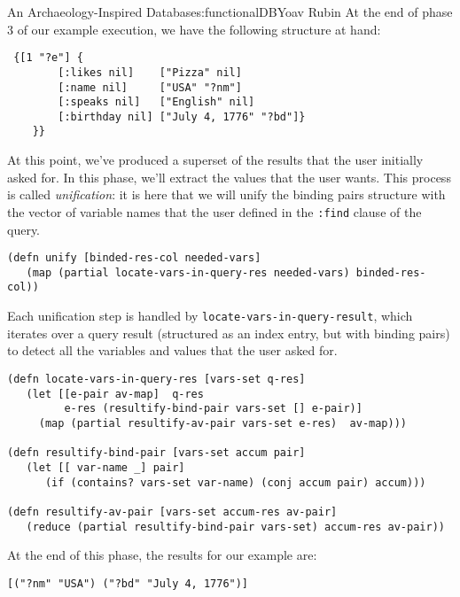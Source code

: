 \begin{aosachapter}{An Archaeology-Inspired Database}{s:functionalDB}{Yoav Rubin}
At the end of phase 3 of our example execution, we have the following
structure at hand:

\begin{verbatim}
 {[1 "?e"] {
        [:likes nil]    ["Pizza" nil]
        [:name nil]     ["USA" "?nm"]
        [:speaks nil]   ["English" nil] 
        [:birthday nil] ["July 4, 1776" "?bd"]} 
    }}
\end{verbatim}

\label{phase-4-unify-and-report}

At this point, we've produced a superset of the results that the user
initially asked for. In this phase, we'll extract the values that the
user wants. This process is called \emph{unification}: it is here that
we will unify the binding pairs structure with the vector of variable
names that the user defined in the \texttt{:find} clause of the query.

\begin{verbatim}
(defn unify [binded-res-col needed-vars]
   (map (partial locate-vars-in-query-res needed-vars) binded-res-col))
\end{verbatim}

Each unification step is handled by
\texttt{locate-vars-in-query-result}, which iterates over a query result
(structured as an index entry, but with binding pairs) to detect all the
variables and values that the user asked for.

\begin{verbatim}
(defn locate-vars-in-query-res [vars-set q-res]
   (let [[e-pair av-map]  q-res
         e-res (resultify-bind-pair vars-set [] e-pair)]
     (map (partial resultify-av-pair vars-set e-res)  av-map)))

(defn resultify-bind-pair [vars-set accum pair]
   (let [[ var-name _] pair]
      (if (contains? vars-set var-name) (conj accum pair) accum)))

(defn resultify-av-pair [vars-set accum-res av-pair]
   (reduce (partial resultify-bind-pair vars-set) accum-res av-pair))
\end{verbatim}

At the end of this phase, the results for our example are:

\begin{verbatim}
[("?nm" "USA") ("?bd" "July 4, 1776")]
\end{verbatim}

\label{running-the-show}


\end{aosachapter}
